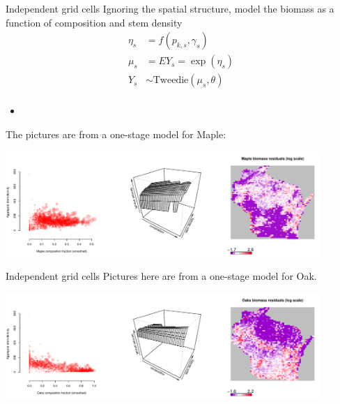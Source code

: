\documentclass{beamer}
\begin{document}
\begin{frame}{Independent grid cells}
  Ignoring the spatial structure, model the biomass as a function of composition and stem density\\
  \begin{align*}
    \eta_s &= f(p_{k,s}, \gamma_s)\\
    \mu_s &= EY_s = \exp{(\eta_s)}\\
    Y_s &\sim \text{Tweedie}(\mu_s, \theta)\\
  \end{align*}
  \begin{itemize}
    \item 
  \end{itemize}

\end{frame}

\begin{frame}
  The pictures are from a one-stage model for Maple:\\
  \begin{center}
    \includegraphics[width=0.9\textwidth]{../../figures/aspatial-tweedie/Maple-plots.pdf}
  \end{center}
\end{frame}

\begin{frame}{Independent grid cells}
 Pictures here are from a one-stage model for Oak.\\
  \begin{center}
    \includegraphics[width=0.9\textwidth]{../../figures/aspatial-tweedie/Oaks-plots.pdf}
  \end{center}
\end{frame}
\end{document}
